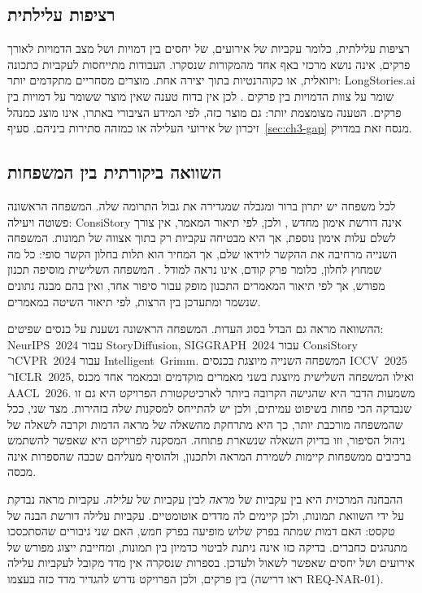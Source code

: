 \subsection{רציפות עלילתית}
רציפות עלילתית, כלומר עקביות של אירועים, של יחסים בין דמויות ושל מצב הדמויות לאורך פרקים, אינה נושא מרכזי באף אחד מהמקורות שנסקרו. העבודות מתייחסות לעקביות כתכונה ויזואלית, או כקוהרנטיות בתוך יצירה אחת. מוצרים מסחריים מתקדמים יותר: \textenglish{LongStories.ai} שומר על צוות הדמויות בין פרקים \cite{longstories}. לכן אין בדוח טענה שאין מוצר ששומר על דמויות בין פרקים. הטענה מצומצמת יותר: גם מוצר כזה, לפי המידע הציבורי באתרו, אינו מוצג כמנהל זיכרון של אירועי העלילה או כמזהה סתירות ביניהם. סעיף~\ref{sec:ch3-gap} מנסח זאת במדויק.

\subsection{השוואה ביקורתית בין המשפחות}
לכל משפחה יש יתרון ברור ומגבלה שמגדירה את גבול התרומה שלה. המשפחה הראשונה פשוטה ויעילה: \textenglish{ConsiStory} אינה דורשת אימון מחדש \cite{tewel2024consistory}, ולכן, לפי תיאור המאמר, אין צורך לשלם עלות אימון נוספת, אך היא מבטיחה עקביות רק בתוך אצווה של תמונות. המשפחה השנייה מרחיבה את ההקשר לוידאו שלם, אך המחיר הוא תלות בחלון הקשר סופי: כל מה שמחוץ לחלון, כלומר פרק קודם, אינו נראה למודל \cite{guo2025lct}. המשפחה השלישית מוסיפה תכנון מפורש, אך לפי תיאור המאמרים \cite{lin2023videodirectorgpt,hu2024storyagent} התכנון מופק עבור סיפור אחד, ואין בהם מבנה נתונים שנשמר ומתעדכן בין הרצות, לפי תיאור השיטה במאמרים.

ההשוואה מראה גם הבדל בסוג העדות. המשפחה הראשונה נשענת על כנסים שפיטים: \mbox{\textenglish{NeurIPS 2024}} עבור \textenglish{StoryDiffusion}, \mbox{\textenglish{SIGGRAPH 2024}} עבור \textenglish{ConsiStory} ו־\mbox{\textenglish{CVPR 2024}} עבור \mbox{\textenglish{Intelligent Grimm}}. המשפחה השנייה מיוצגת בכנסים \mbox{\textenglish{ICCV 2025}} ו־\mbox{\textenglish{ICLR 2025}}, ואילו המשפחה השלישית מיוצגת בשני מאמרים מוקדמים ובמאמר אחד מכנס \mbox{\textenglish{AACL 2026}}. משמעות הדבר היא שהגישה הקרובה ביותר לארכיטקטורת הפרויקט היא גם זו שנבדקה הכי פחות בשיפוט עמיתים, ולכן יש להתייחס למסקנות שלה בזהירות. מצד שני, ככל שהמשפחה מורכבת יותר, כך היא מתרחקת מהשאלה של מראה הדמות וקרבה לשאלה של ניהול הסיפור, וזו בדיוק השאלה שנשארת פתוחה. המסקנה לפרויקט היא שאפשר להשתמש ברכיבים ממשפחות קיימות לשמירת המראה ולתכנון, ולהוסיף מעליהם שכבה שהספרות אינה מכסה.

ההבחנה המרכזית היא בין עקביות של \emph{מראה} לבין עקביות של \emph{עלילה}. עקביות מראה נבדקת על ידי השוואת תמונות, ולכן קיימים לה מדדים אוטומטיים. עקביות עלילה דורשת הבנה של טקסט: האם דמות שמתה בפרק שלוש מופיעה בפרק חמש, האם שני גיבורים שהסתכסכו מתנהגים כחברים. בדיקה כזו אינה ניתנת לביטוי כדמיון בין תמונות, ומחייבת ייצוג מפורש של אירועים ושל יחסים שאפשר לשאול ולעדכן. בספרות שנסקרה אין מדד מקובל לעקביות עלילה בין פרקים, ולכן הפרויקט נדרש להגדיר מדד כזה בעצמו (ראו דרישה \textenglish{REQ-NAR-01}).

